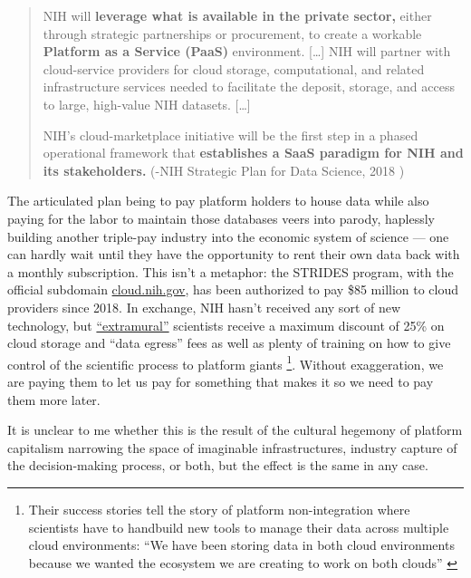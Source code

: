 \begin{quote}
NIH will \textbf{leverage what is available in the private sector,}
either through strategic partnerships or procurement, to create a
workable \textbf{Platform as a Service (PaaS)} environment. {[}\ldots{]}
NIH will partner with cloud-service providers for cloud storage,
computational, and related infrastructure services needed to facilitate
the deposit, storage, and access to large, high-value NIH datasets.
{[}\ldots{]}

NIH's cloud-marketplace initiative will be the first step in a phased
operational framework that \textbf{establishes a SaaS paradigm for NIH
and its stakeholders.} (-NIH Strategic Plan for Data Science, 2018 \citep{NIHStrategicPlan2018} )
\end{quote}

The articulated plan being to pay platform holders to house data while
also paying for the labor to maintain those databases veers into parody,
haplessly building another triple-pay industry \citep{buranyiStaggeringlyProfitableBusiness2017}  into the economic system
of science --- one can hardly wait until they have the opportunity to
rent their own data back with a monthly subscription. This isn't a
metaphor: the STRIDES program, with the official subdomain
\href{https://web.archive.org/web/20210729131920/https://cloud.nih.gov/}{cloud.nih.gov},
has been authorized to pay \$85 million to cloud providers since 2018.
In exchange, NIH hasn't received any sort of new technology, but
\href{https://web.archive.org/web/20211006003547/https://cloud.nih.gov/enrollment/account-type/}{``extramural''}
scientists receive a maximum discount of 25\% on cloud storage and
``data egress'' fees as well as plenty of training on how to give
control of the scientific process to platform giants \citep{reillyNIHSTRIDESInitiative2021} \footnote{Their success stories tell
  the story of platform non-integration where scientists have to
  handbuild new tools to manage their data across multiple cloud
  environments: ``We have been storing data in both cloud environments
  because we wanted the ecosystem we are creating to work on both
  clouds'' \citep{STRIDESInitiativeSuccess2020} }. Without
exaggeration, we are paying them to let us pay for something that makes
it so we need to pay them more later.

It is unclear to me whether this is the result of the cultural hegemony
of platform capitalism narrowing the space of imaginable
infrastructures, industry capture of the decision-making process, or
both, but the effect is the same in any case.


